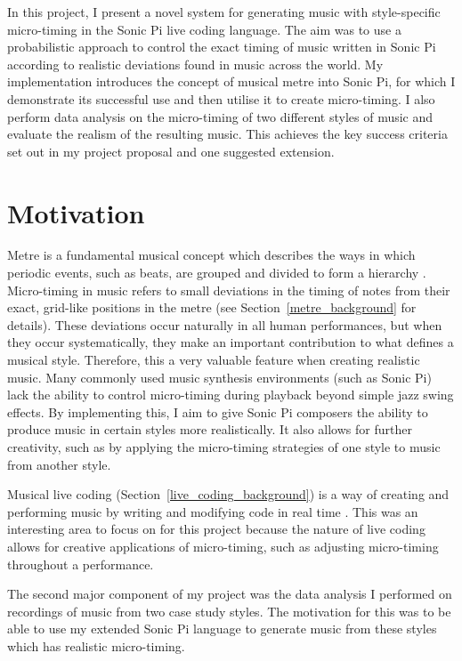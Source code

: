 \documentclass[12pt,twoside,openright]{report}
\begin{document}
In this project, I present a novel system for generating music with
style-specific micro-timing in the Sonic Pi live coding language. The aim was to
use a probabilistic approach to control the exact timing of music written in
Sonic Pi according to realistic deviations found in music across the world. My
implementation introduces the concept of musical metre into Sonic Pi, for which
I demonstrate its successful use and then utilise it to create micro-timing. I also
perform data analysis on the micro-timing of two different styles of music and
evaluate the realism of the resulting music. This achieves the key success
criteria set out in my project proposal and one suggested extension.



\section{Motivation} \label{motivation}

Metre is a fundamental musical concept which describes the ways in which periodic events, such as beats, are grouped and divided to form a hierarchy \cite{london2012}. Micro-timing in music refers to small deviations in the timing of notes from
their exact, grid-like positions in the metre (see Section~\ref{metre_background} for details). These
deviations occur naturally in all human performances, but when they occur
systematically, they make an important contribution to what defines a musical
style. Therefore, this a very valuable feature when creating realistic music.
Many commonly used music synthesis environments (such as Sonic Pi) lack the
ability to control micro-timing during playback beyond simple jazz swing effects.
By implementing this, I aim to give Sonic Pi composers the ability to produce
music in certain styles more realistically. It also allows for further
creativity, such as by applying the micro-timing strategies of one style to
music from another style.

Musical live coding (Section~\ref{live_coding_background}) is a way of creating and performing music by writing
and modifying code in real time \cite{magnusson2011}. This was an interesting area to focus on for
this project because the nature of live coding allows for creative applications
of micro-timing, such as adjusting micro-timing throughout a performance.

The second major component of my project was the data analysis I performed
on recordings of music from two case study styles. The motivation for this was
to be able to use my extended Sonic Pi language to generate music from these styles which
has realistic micro-timing.
\end{document}
